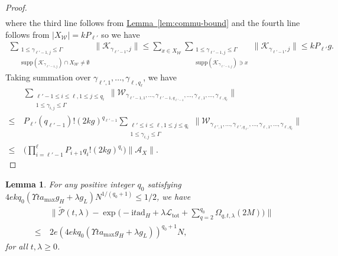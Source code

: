 \documentclass[11pt]{article}
\newtheorem{lemma}{Lemma}
\newcommand{\lem}[1]{\hyperref[lem:#1]{Lemma~\ref*{lem:#1}}}
\renewcommand{\i}{\mathrm{i}}
\newcommand{\ad}{\mathrm{ad}}
\renewcommand{\P}{\mathcal{P}}
\newcommand{\tot}{\mathrm{tot}}
\newcommand{\mc}{\mathcal}
\begin{document}
\begin{proof}
\begin{align*}
    \end{align*}
    where the third line follows from \lem{commu-bound} and the fourth line follows from $|X_{\mc W}| = kP_{\ell'}$ so we have \begin{align*}
    \sum_{\substack{1\le\gamma_{\ell'-1,j}\le \Gamma\\\mathrm{supp}(\mc K_{\gamma_{\ell'-1,j}})\cap X_{\mc W}\neq \emptyset}}\|\mc K_{\gamma_{\ell'-1}, j}\| \le \sum_{x\in X_{\mc W}}\sum_{\substack{1\le\gamma_{\ell'-1,j}\le \Gamma\\\mathrm{supp}(\mc K_{\gamma_{\ell'-1,j}})\ni x}}\|\mc K_{\gamma_{\ell'-1}, j}\|\le k P_{\ell'} g.
    \end{align*}
    Taking summation over $\gamma_{\ell',1}, \ldots, \gamma_{\ell,q_\ell}$, we have \begin{align*}
        &\sum_{\substack{\ell'-1\le i\le \ell, 1\le j\le q_i\\ 1\le \gamma_{i,j}\le \Gamma}} \Big\|\mc W_{\gamma_{\ell'-1,1}, \ldots, \gamma_{\ell'-1, q_{\ell'-1}}, \ldots, \gamma_{\ell, 1}, \ldots, \gamma_{\ell,q_\ell}}\Big\|  \\
        \le~& P_{\ell'}(q_{\ell'-1})!(2kg)^{q_{\ell'-1}}\sum_{\substack{\ell'\le i\le \ell, 1\le j\le q_i\\ 1\le \gamma_{i,j}\le \Gamma}}
        \Big\|\mc W_{\gamma_{\ell',1}, \ldots, \gamma_{\ell', q_{\ell'}}, \ldots, \gamma_{\ell, 1}, \ldots, \gamma_{\ell,q_\ell}}\Big\|\\
        \le~& \bigg(\prod_{i=\ell'-1}^{\ell}P_{i+1} q_i!(2kg)^{q_i}\bigg)\|\mc A_X\|.
    \end{align*}
\end{proof}
\begin{lemma}
\label{lem:bch-approx} 
    For any positive integer $q_0$ satisfying $4ekq_0(\Upsilon t a_{\max}g_H+\lambda g_L) N^{1/(q_0+1)}\le 1/2$, we have \begin{align*}
        &\Bigg\|\tilde{\P}(t,\lambda)-\exp\bigg( -\i t \ad_H+\lambda\mc L_{\tot}+\sum_{q=2}^{q_0} \Omega_{q,t,\lambda}(2M) \bigg)\Bigg\|\\
        \le~& 2e (4ekq_0(\Upsilon t a_{\max}g_H+\lambda g_L))^{q_0+1}N,
    \end{align*}
    for all $t,\lambda\ge0$.
\end{lemma}
\end{document}
